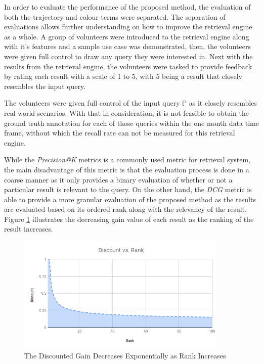 In order to evaluate the performance of the proposed method, the evaluation of both the trajectory and colour terms were separated. The separation of evaluations allows further understanding on how to improve the retrieval engine as a whole. A group of volunteers were introduced to the retrieval engine along with it's features and a sample use case was demonstrated, then, the volunteers were given full control to draw any query they were interested in. Next with the results from the retrieval engine, the volunteers were tasked to provide feedback by rating each result with a scale of 1 to 5, with 5 being a result that closely resembles the input query. 

The volunteers were given full control of the input query $\mathbb{P}$ as it closely resembles real world scenarios. With that in consideration, it is not feasible to obtain the ground truth annotation for each of those queries within the one month data time frame, without which the recall rate can not be measured for this retrieval engine. 

While the \textit{Precision@K} metrics is a commonly used metric for retrieval system, the main disadvantage of this metric is that the evaluation process is done in a coarse manner as it only provides a binary evaluation of whether or not a particular result is relevant to the query. On the other hand, the \textit{DCG} metric is able to provide a more granular evaluation of the proposed method as the results are evaluated based on its ordered rank along with the relevancy of the result. Figure \ref{fig:dcgGain} illustrates the decreasing gain value of each result as the ranking of the result increases. 

\begin{figure}[h]
\centering
\includegraphics[width=0.9\textwidth]{image/retrievalTwo/discountvsrank.png}
\caption{The Discounted Gain Decreases Exponentially as Rank Increases}
\label{fig:dcgGain}       %
\end{figure}

